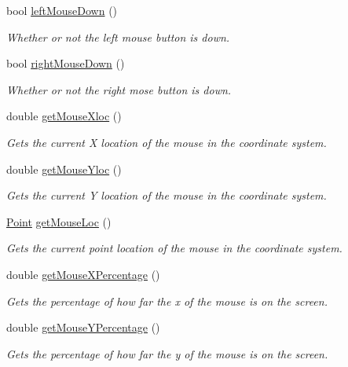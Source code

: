 \begin{CompactItemize}
bool \hyperlink{class_input_b83a65acc24c327fc49b9048a5d9ddda}{leftMouseDown} ()
\begin{CompactList}\small\item\em Whether or not the left mouse button is down. \item\end{CompactList}\item 
bool \hyperlink{class_input_60ecfa072eb3d427fa8cb1301108c2a7}{rightMouseDown} ()
\begin{CompactList}\small\item\em Whether or not the right mose button is down. \item\end{CompactList}\item 
double \hyperlink{class_input_d9e2f63414a5cd0d7f4d79614a4764c8}{getMouseXloc} ()
\begin{CompactList}\small\item\em Gets the current X location of the mouse in the coordinate system. \item\end{CompactList}\item 
double \hyperlink{class_input_a5d8de5541d02dfc81ead5710ed3bded}{getMouseYloc} ()
\begin{CompactList}\small\item\em Gets the current Y location of the mouse in the coordinate system. \item\end{CompactList}\item 
\hyperlink{class_point}{Point} \hyperlink{class_input_ded500159307fc2ea8c478848e88ecab}{getMouseLoc} ()
\begin{CompactList}\small\item\em Gets the current point location of the mouse in the coordinate system. \item\end{CompactList}\item 
double \hyperlink{class_input_08d4ec3b79961d3c98a057bb718f31e4}{getMouseXPercentage} ()
\begin{CompactList}\small\item\em Gets the percentage of how far the x of the mouse is on the screen. \item\end{CompactList}\item 
double \hyperlink{class_input_518969c4750a7c64fabca9fbe4c3ba55}{getMouseYPercentage} ()
\begin{CompactList}\small\item\em Gets the percentage of how far the y of the mouse is on the screen. \item\end{CompactList}\item 

\end{CompactItemize}
